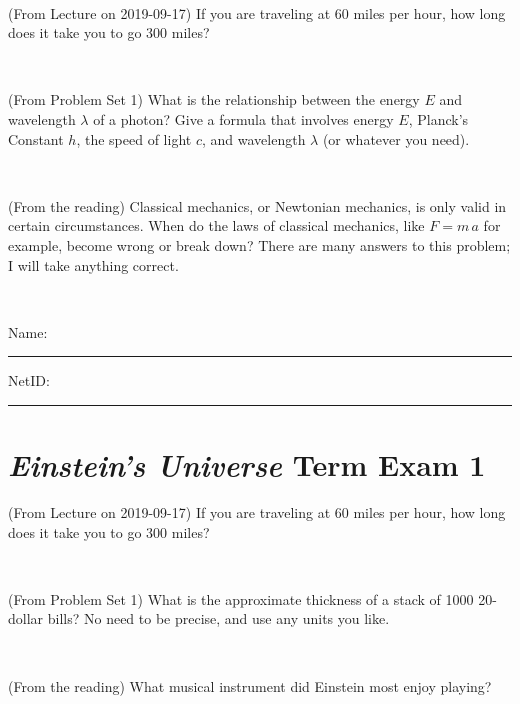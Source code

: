 \documentclass[12pt, letterpaper]{article}
\begin{document}
\vfill ~

\begin{problem} (From Lecture on 2019-09-17)
If you are traveling at 60 miles per hour, how long does
it take you to go 300 miles?
\end{problem}


\vfill ~

\begin{problem} (From Problem Set 1)
What is the relationship between the energy $E$ and wavelength
$\lambda$ of a photon? Give a formula that involves energy $E$,
Planck's Constant $h$, the speed of light $c$, and wavelength
$\lambda$ (or whatever you need).
\end{problem}

\vfill ~

\begin{problem} (From the reading)
Classical mechanics, or Newtonian mechanics, is only valid in certain
circumstances. When do the laws of classical mechanics, like $F =
m\,a$ for example, become wrong or break down? There are many answers
to this problem; I will take anything correct.
\end{problem}


\vfill ~


\cleardoublepage



\noindent
Name: \rule[-1ex]{0.60\textwidth}{0.1pt}
NetID: \rule[-1ex]{0.20\textwidth}{0.1pt}

\section*{\textsl{Einstein's Universe} Term Exam 1}
\setcounter{problem}{1}


\begin{problem} (From Lecture on 2019-09-17)
If you are traveling at 60 miles per hour, how long does
it take you to go 300 miles?
\end{problem}


\vfill ~

\begin{problem} (From Problem Set 1)
What is the approximate thickness of a stack of 1000 20-dollar bills?
No need to be precise, and use any units you like.
\end{problem}


\vfill ~

\begin{problem} (From the reading)
What musical instrument did Einstein most enjoy playing?
\end{problem}
\end{document}
